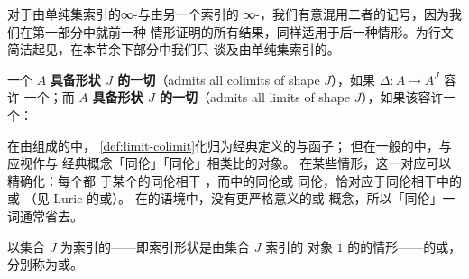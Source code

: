 对于由单纯集索引的\trDiagram{}∞-\trCategory{}与由另一个\trInfinityCategory{}索引的%
\trDiagram{}∞-\trCategory{}，我们有意混用二者的记号，因为我们在第一部分中就前一种
情形证明的所有结果，同样适用于后一种情形。为行文简洁起见，在本节余下部分中我们只
谈及由单纯集索引的\trDiagram{}。

\begin{definition}\label{def:limit-colimit}
一个\trInfinityCategory{} $A$ \textbf{具备形状 $J$ 的一切\trColimit}（admits all
colimits of shape $J$），如果\trConstantFunctor{} $\Delta\colon A\to A^J$ 容许
一个\trLeftAdjoint{}；而 $A$ \textbf{具备形状 $J$ 的一切\trLimit}（admits all
limits of shape $J$），如果该\trConstantFunctor{}容许一个\trRightAdjoint{}：
\begin{center}
\end{center}
在由\trCategory{}组成的\trInfinityCosmos{}中，
\cref{def:limit-colimit}化归为经典定义的\trLimit{}与\trColimit{}函子；
但在一般的\trInfinityCategory{}中，\trLimit{}与\trColimit{}应视作与
经典概念「同伦\trLimit{}」「同伦\trColimit{}」相类比的对象。
在某些情形，这一对应可以精确化：每个\trQuasiCategory{}都%
\trEquivalence{}于某个\trKanComplex\trEnrichedCategory{}的同伦相干\trNerve
\cite[7.2.2]{bib111}，而\trKanComplex\trEnrichedCategory{}中的同伦\trLimit\trCone{}或
同伦\trColimit\trCone{}，恰对应于同伦相干\trNerve{}中的\trLimit\trCone{}或\trColimit\trCone
（见 Lurie 的\cite[4.2.4.1]{bib78}或\cite[6.1.4, 6.2.7]{bib113}）。
在\trInfinityCategory{}的语境中，没有更严格意义的\trLimit{}或%
\trColimit{}概念，所以「同伦」一词通常省去。
\end{definition}

以集合 $J$ 为索引的\trDiagram{}——即索引形状是由集合 $J$ 索引的%
\trTerminal{}对象 $1$ 的\trCoproduct{}的情形——的\trLimit{}或\trColimit{}，
分别称为\trProduct{}或\trCoproduct{}。


